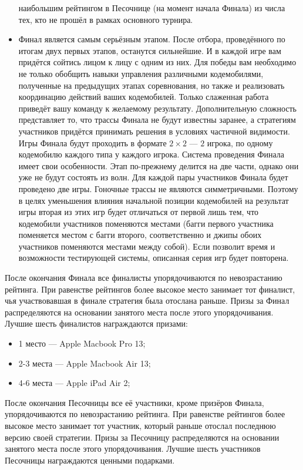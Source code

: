 \begin{itemize}
        наибольшим рейтингом в Песочнице (на момент начала Финала) из числа тех, кто не прошёл в рамках основного турнира.
  \item Финал является самым серьёзным этапом. После отбора, проведённого по итогам двух первых этапов, останутся сильнейшие. И в каждой
        игре вам придётся сойтись лицом к лицу с одним из них. Для победы вам необходимо не только обобщить навыки управления различными
        кодемобилями, полученные на предыдущих этапах соревнования, но также и реализовать координацию действий ваших кодемобилей. Только
        слаженная работа приведёт вашу команду к желаемому результату. Дополнительную сложность представляет то, что трассы Финала не будут
        известны заранее, а стратегиям участников придётся принимать решения в условиях частичной видимости. Игры Финала будут проходить в
        формате $2\times2$ --- $2$ игрока, по одному кодемобилю каждого типа у каждого игрока. Система проведения Финала имеет свои
        особенности. Этап по-прежнему делится на две части, однако они уже не будут состоять из волн. Для каждой пары участников Финала
        будет проведено две игры. Гоночные трассы не являются симметричными. Поэтому в целях уменьшения влияния начальной позиции
        кодемобилей на результат игры вторая из этих игр будет отличаться от первой лишь тем, что кодемобили участников поменяются местами
        (багги первого участника поменяется местом с багги второго, соответственно и джипы обоих участников поменяются местами между собой).
        Если позволит время и возможности тестирующей системы, описанная серия игр будет повторена.
\end{itemize}

После окончания Финала все финалисты упорядочиваются по невозрастанию рейтинга. При равенстве рейтингов более высокое место занимает тот
финалист, чья участвовавшая в финале стратегия была отослана раньше. Призы за Финал распределяются на основании занятого места после этого
упорядочивания. Лучшие шесть финалистов награждаются призами:
\begin{itemize}
\item 1 место --- Apple Macbook Pro 13\textquotedbl;
\item 2-3 места --- Apple Macbook Air 13\textquotedbl;
\item 4-6 места --- Apple iPad Air 2;
\end{itemize}

После окончания Песочницы все её участники, кроме призёров Финала, упорядочиваются по невозрастанию рейтинга. При равенстве рейтингов более
высокое место занимает тот участник, который раньше отослал последнюю версию своей стратегии. Призы за Песочницу распределяются на основании
занятого места после этого упорядочивания. Лучшие шесть участников Песочницы награждаются ценными подарками.

